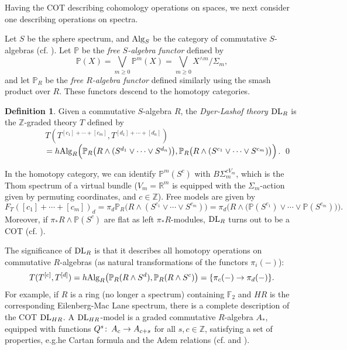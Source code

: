 \documentclass{gtpart}
\theoremstyle{definition}
\newtheorem{defn}[thm]{Definition}
\theoremstyle{remark}
\def\co{\colon\thinspace}
\newcommand{\mb}[1]{\mathbb{#1}}
\newcommand{\DL}{{\rm DL}}
\newcommand{\Alg}{{\rm Alg}}
\begin{document}
Having the COT describing cohomology operations on spaces, we next consider 
one describing operations on spectra.  

Let $S$ be the sphere spectrum, and $\Alg_S$ be the category of commutative 
$S$-algebras (cf. \cite{EKMM}).  Let $\mb P$ be the {\em free $S$-algebra 
functor} defined by 
\[
 {\mb P}(X) = \bigvee_{m \geq 0} {\mb P}^m(X) = \bigvee_{m \geq 0} 
 X^{\wedge m}/\Sigma_m, 
\]
and let ${\mb P}_R$ be the {\em free $R$-algebra functor} defined similarly 
using the smash product over $R$.  These functors descend to the homotopy 
categories.  
\begin{defn}
\label{def:DL}
 Given a commutative $S$-algebra $R$, the {\em Dyer-Lashof theory}  $\DL_R$ is 
 the $\mb Z$-graded theory $T$ defined by 
 \[
  T(T^{[c_1]+\cdots+[c_m]},T^{[d_1]+\cdots+[d_n]}) 
  ~~~~~~~~~~~~~~~~~~~~~~~~~~~~~~~~~~~~~~~~~~~~~~~~~~
 \]
 $~~~~~~~~~~~~~~~= h\Alg_R \Big({\mb P}_R \big(R \wedge (S^{d_1} \vee \cdots 
 \vee S^{d_n}) \big), {\mb P}_R \big(R \wedge (S^{c_1} \vee \cdots \vee 
 S^{c_m}) \big) \Big)$.  \qed
\end{defn}
In the homotopy category, we can identify ${\mb P}^m (S^c)$ with 
$B\Sigma_m^{cV_m}$, which is the Thom spectrum of a virtual bundle 
($V_m = {\mb R}^m$ is equipped with the $\Sigma_m$-action given by permuting 
coordinates, and $c \in {\mb Z}$).  Free models are given by 
\[
 F_T([c_1]+\cdots+[c_m])_d = \pi_d {\mb P}_R  \big( R \wedge (S^{c_1} \vee 
 \cdots \vee S^{c_m}) \big) = \pi_d \Big( R \wedge \big({\mb P}(S^{c_1}) \vee 
 \cdots \vee {\mb P}(S^{c_m})\big) \Big).  
\]
Moreover, if $\pi_*R\wedge{\mb P}(S^c)$ are flat as left $\pi_*R$-modules, 
$\DL_R$ turns out to be a COT (cf. \cite[lemma 7.5]{lpo}).  

The significance of $\DL_R$ is that it describes all homotopy operations on 
commutative $R$-algebras (as natural transformations of the functors 
$\pi_i(-)$): 
\[
 T(T^{[c]},T^{[d]}) = h\Alg_R \big( {\mb P}_R(R \wedge S^d), 
 {\mb P}_R(R \wedge S^c) \big) = \{\pi_c(-) \to \pi_d(-)\}.  
\]
For example, if $R$ is a ring (no longer a spectrum) containing ${\mb F}_2$ 
and $HR$ is the corresponding Eilenberg-Mac Lane spectrum, there is a complete 
description of the COT $\DL_{HR}$.  A $\DL_{HR}$-model is a graded commutative 
$R$-algebra $A_*$, equipped with functions $Q^s\co A_c \to A_{c+s}$ for all 
$s, c \in {\mb Z}$, satisfying a set of properties, e.g.he Cartan 
formula and the Adem relations (cf. \cite[VIII.3.3]{BMMS} and 
\cite[section 10]{lpo}).  
\end{document}
